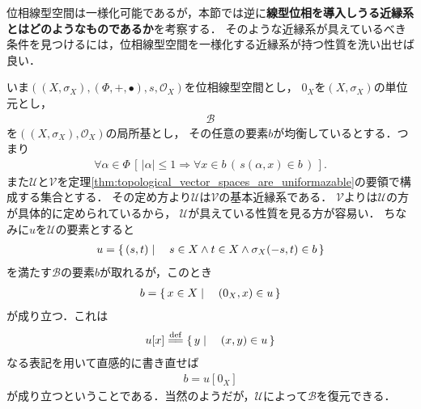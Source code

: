 	位相線型空間は一様化可能であるが，本節では逆に{\bf 線型位相を導入しうる近縁系とはどのようなものであるか}を考察する．
	そのような近縁系が具えているべき条件を見つけるには，位相線型空間を一様化する近縁系が持つ性質を洗い出せば良い．
	
	いま$\left(\left(X,\sigma_X\right),(\Phi,+,\bullet),s,\mathscr{O}_X\right)$を位相線型空間とし，
	$0_X$を$\left(X,\sigma_X\right)$の単位元とし，
	\begin{align}
		\mathscr{B}
	\end{align}
	を$\left(\left(X,\sigma_X\right),\mathscr{O}_X\right)$の局所基とし，
	その任意の要素$b$が均衡しているとする．つまり
	\begin{align}
		\forall \alpha \in \Phi\,
		\left[\, |\alpha| \leq 1 \Longrightarrow \forall x \in b\, \left(\, s(\alpha,x) \in b\, \right)\, \right].
	\end{align}
	また$\mathscr{U}$と$\mathscr{V}$を定理\ref{thm:topological_vector_spaces_are_uniformazable}の要領で構成する集合とする．
	その定め方より$\mathscr{U}$は$\mathscr{V}$の基本近縁系である．
	$\mathscr{V}$よりは$\mathscr{U}$の方が具体的に定められているから，
	$\mathscr{U}$が具えている性質を見る方が容易い．
	ちなみに$u$を$\mathscr{U}$の要素とすると
	\begin{align}
		u = \left\{\, (s,t) \mid \quad s \in X \wedge t \in X \wedge \sigma_X(-s,t) \in b\, \right\}
	\end{align}
	を満たす$\mathscr{B}$の要素$b$が取れるが，このとき
	\begin{align}
		b = \left\{\, x \in X \mid \quad \left(0_X,x\right) \in u\, \right\}
	\end{align}
	が成り立つ．これは
	\begin{align}
		u[x] \defeq \Set{y}{(x,y) \in u}
	\end{align}
	なる表記を用いて直感的に書き直せば
	\begin{align}
		b = u[0_X]
	\end{align}
	が成り立つということである．当然のようだが，$\mathscr{U}$によって$\mathscr{B}$を復元できる．
	

